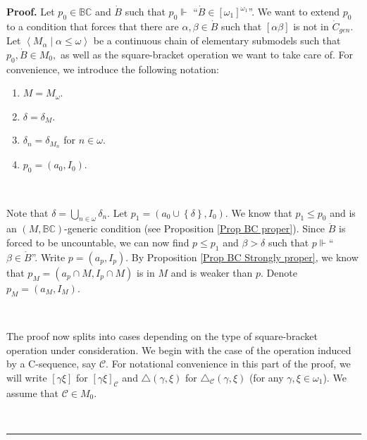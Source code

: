 \documentclass{article}
\newenvironment{proof}[1][Proof]{\noindent\textbf{#1.} }{\ \rule{0.5em}{0.5em}}
\begin{document}
\begin{proof}
Let $p_{0}\in\mathbb{BC}$ and $\dot{B}$ such that $p_{0}\Vdash$%
\textquotedblleft$\dot{B}\in\left[  \omega_{1}\right]  ^{\omega_{1}}%
$\textquotedblright. We want to extend $p_{0}$ to a condition that forces that
there are $\alpha,\beta\in\dot{B}$ such that $\left[  \alpha\beta\right]  $ is
not in $\dot{C}_{gen}$. Let $\left\langle M_{\alpha}\mid\alpha\leq
\omega\right\rangle $ be a continuous chain of elementary submodels such that
$p_{0},\dot{B}\in M_{0},$ as well as the square-bracket operation we want to
take care of. For convenience, we introduce the following notation:

\begin{enumerate}
\item $M=M_{\omega}.$

\item $\delta=\delta_{M}.$

\item $\delta_{n}=\delta_{M_{n}}$ for $n\in\omega.$

\item $p_{0}=\left(  a_{0},I_{0}\right)  .$
\end{enumerate}

\qquad\ \ \qquad\ \ 

Note that $\delta=\bigcup\limits_{n\in\omega}\delta_{n}.$ Let $p_{1}=\left(
a_{0}\cup\left\{  \delta\right\}  ,I_{0}\right)  .$ We know that $p_{1}\leq
p_{0}$ and is an $(M,\mathbb{BC})$-generic condition (see Proposition
\ref{Prop BC proper}). Since $\dot{B}$ is forced to be uncountable, we can now
find $p\leq p_{1}$ and $\beta>\delta$ such that $p\Vdash$\textquotedblleft%
$\beta\in\dot{B}$\textquotedblright. Write $p=\left(  a_{p},I_{p}\right)  .$
By Proposition \ref{Prop BC Strongly proper}, we know that $p_{M}=\left(
a_{p}\cap M,I_{p}\cap M\right)  $ is in $M$ and is weaker than $p.$ Denote
$p_{M}=\left(  a_{M},I_{M}\right)  .$

\qquad\qquad\qquad\qquad\ \ \ \ 

The proof now splits into cases depending on the type of square-bracket
operation under consideration. We begin with the case of the operation induced
by a \textsf{C}-sequence, say $\mathcal{C}.$ For notational convenience in
this part of the proof, we will write $\left[  \gamma\xi\right]  $ for
$\left[  \gamma\xi\right]  _{\mathcal{C}}$ and $\triangle\left(  \gamma
,\xi\right)  $ for $\triangle_{\mathcal{C}}\left(  \gamma,\xi\right)  $ (for
any $\gamma,\xi\in\omega_{1}$). We assume that $\mathcal{C}\in M_{0}.$


\end{proof}
\end{document}

